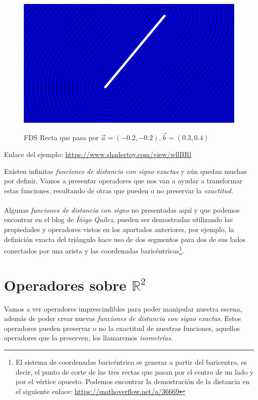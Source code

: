 \begin{figure}[H]
  \centering
  \captionsetup{justification=centering}%
  \includegraphics[width=1.0\textwidth]{secciones/imagenes/sdf/2d/sdf_segmento.png}\label{fig:segmento}
  \caption{FDS Recta que pasa por \(\Vec{a}=(-0.2, -0.2), \Vec{b}=(0.3, 0.4)\)}
\end{figure}

Enlace del ejemplo: \url{https://www.shadertoy.com/view/wllBRl}

Existen infinitas \textit{funciones de distancia con signo exactas} y aún quedan muchas por definir. Vamos a presentar operadores que nos van a ayudar a transformar estas funciones, resultando de otras que pueden o no preservar la \textit{exactitud}.\\\\
Algunas \textit{funciones de distancia con signo} no presentadas aquí y que podemos encontrar en el blog de \textit{Íñigo Quilez}, pueden ser demostradas utilizando las propiedades y operadores vistos en los apartados anteriores, por ejemplo, la definición exacta del triángulo hace uso de dos segmentos para dos de sus lados conectados por una arista y las coordenadas baricéntricas\footnote{El sistema de coordenadas baricéntrico se generar a partir del baricentro, es decir, el punto de corte de las tres rectas que pasan por el centro de un lado y por el vértice opuesto. Podemos encontrar la demostración de la distancia en el siguiente enlace: \url{https://mathoverflow.net/a/36669}}.

\section{Operadores sobre \(\mathbb{R}^2\)}
Vamos a ver operadores imprescindibles para poder manipular nuestra escena, además de poder crear nuevas \textit{funciones de distancia con signo exactas}. Estos operadores pueden preservar o no la exactitud de nuestras funciones, aquellos operadores que la preserven, los llamaremos \textit{isometrías}.

